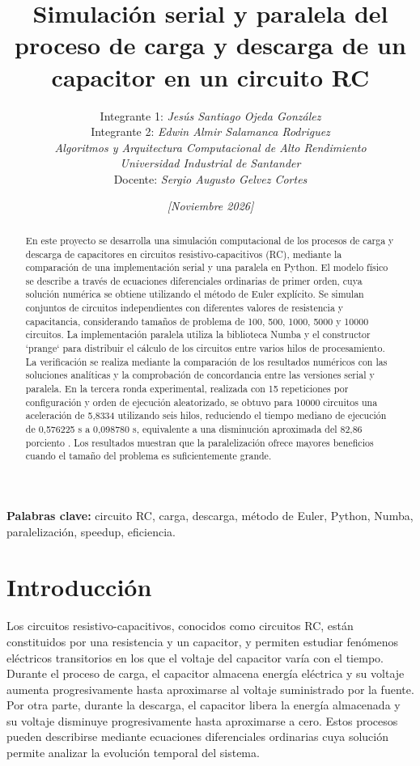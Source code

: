 \documentclass[11pt,a4paper]{article}
\title{\textbf{Simulación serial y paralela del proceso de carga y descarga de un capacitor en un circuito RC}}
\author{
Integrante 1: \textit{Jesús Santiago Ojeda González}\\
Integrante 2: \textit{Edwin Almir Salamanca Rodriguez}\\[0.4em]
\textit{Algoritmos y Arquitectura Computacional de Alto Rendimiento}\\[0.4em]
\textit{Universidad Industrial de Santander}\\[0.4em]
Docente: \textit{Sergio Augusto Gelvez Cortes}
}
\date{\textit{[Noviembre 2026]}}
\begin{document}
\maketitle

\begin{abstract}
En este proyecto se desarrolla una simulación computacional de los procesos de carga y descarga de capacitores en circuitos resistivo-capacitivos (RC), mediante la comparación de una implementación serial y una paralela en Python. El modelo físico se describe a través de ecuaciones diferenciales ordinarias de primer orden, cuya solución numérica se obtiene utilizando el método de Euler explícito. Se simulan conjuntos de circuitos independientes con diferentes valores de resistencia y capacitancia, considerando tamaños de problema de 100, 500, 1000, 5000 y 10000 circuitos. La implementación paralela utiliza la biblioteca Numba y el constructor `prange` para distribuir el cálculo de los circuitos entre varios hilos de procesamiento. La verificación se realiza mediante la comparación de los resultados numéricos con las soluciones analíticas y la comprobación de concordancia entre las versiones serial y paralela. En la tercera ronda experimental, realizada con 15 repeticiones por configuración y orden de ejecución aleatorizado, se obtuvo para 10000 circuitos una aceleración de 5,8334 utilizando seis hilos, reduciendo el tiempo mediano de ejecución de 0,576225 s a 0,098780 s, equivalente a una disminución aproximada del 82,86 porciento . Los resultados muestran que la paralelización ofrece mayores beneficios cuando el tamaño del problema es suficientemente grande.
\end{abstract}

\textbf{Palabras clave:} circuito RC, carga, descarga, método de Euler, Python, Numba, paralelización, speedup, eficiencia.

\section{Introducción}
Los circuitos resistivo-capacitivos, conocidos como circuitos RC, están constituidos por una resistencia y un capacitor, y permiten estudiar fenómenos eléctricos transitorios en los que el voltaje del capacitor varía con el tiempo. Durante el proceso de carga, el capacitor almacena energía eléctrica y su voltaje aumenta progresivamente hasta aproximarse al voltaje suministrado por la fuente. Por otra parte, durante la descarga, el capacitor libera la energía almacenada y su voltaje disminuye progresivamente hasta aproximarse a cero. Estos procesos pueden describirse mediante ecuaciones diferenciales ordinarias cuya solución permite analizar la evolución temporal del sistema.
\end{document}
